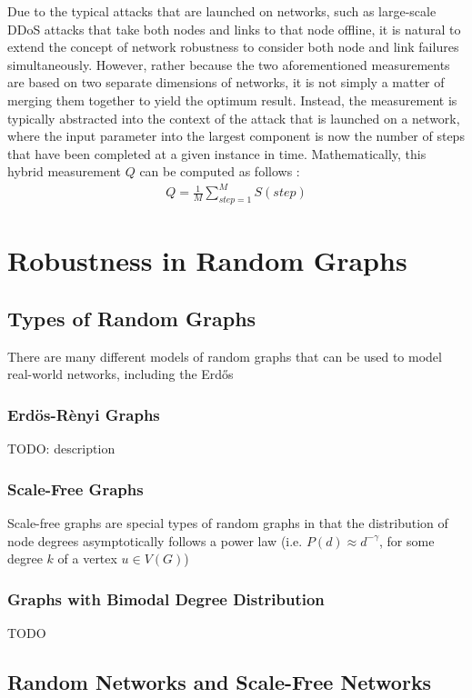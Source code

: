 \documentclass[11pt]{article}
\begin{document}
Due to the typical attacks that are launched on networks, such as large-scale DDoS attacks that take both nodes and links to that node offline, it is natural to extend the concept of network robustness to consider both node and link failures simultaneously. However, rather because the two aforementioned measurements are based on two separate dimensions of networks, it is not simply a matter of merging them together to yield the optimum result. Instead, the measurement is typically abstracted into the context of the attack that is launched on a network, where the input parameter into the largest component is now the number of steps that have been completed at a given instance in time. Mathematically, this hybrid measurement $Q$ can be computed as follows \cite{NRMalicious}:
\begin{eqnarray*}
Q = \frac{1}{M}\sum_{step  = 1}^{M}S(step)
\end{eqnarray*}

\section{Robustness in Random Graphs}

\subsection{Types of Random Graphs}
There are many different models of random graphs that can be used to model real-world networks, including the Erd\H{o}s

\subsubsection{Erd\"{o}s-R\`{e}nyi Graphs}
TODO: description

\subsubsection{Scale-Free Graphs}
Scale-free graphs are special types of random graphs in that the distribution of node degrees asymptotically follows a power law (i.e. $P(d) \approx d^{-\gamma}$, for some degree $k$ of a vertex $u \in V(G)$)

\subsubsection{Graphs with Bimodal Degree Distribution}
TODO

\subsection{Random Networks and Scale-Free Networks}
\end{document}
